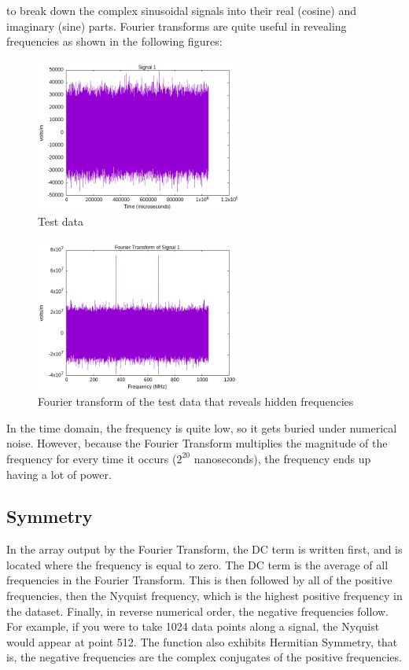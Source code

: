 \documentclass[12pt, reqno]{amsart}
\begin{document}
to break down the complex sinusoidal signals into their real (cosine) and imaginary (sine) parts.
Fourier transforms are quite useful in revealing frequencies as shown in the following figures:
    \begin{figure}[h]
    \centering
    \includegraphics[width=0.6\textwidth]{test_08.png}
    \caption{Test data}
    \label{fig:test-08}
\end{figure}
    \begin{figure}[h]
    \centering
    \includegraphics[width=0.6\textwidth]{fft_test_08.png}
    \caption{Fourier transform of the test data that reveals hidden frequencies}
    \label{fig:fft-test-08}
\end{figure}

In the time domain, the frequency is quite low, so it gets buried under numerical noise. However, because the Fourier Transform multiplies the magnitude of the frequency for every time it occurs ($2^{20}$ nanoseconds), the frequency ends up having a lot of power.

\subsection{Symmetry}
\noindent In the array output by the Fourier Transform, the DC term is written first, and is located where the frequency is equal to zero. The DC term is the average of all frequencies in the Fourier Transform. This is then followed by all of the positive frequencies, then the Nyquist frequency, which is the highest positive frequency in the dataset. Finally, in reverse numerical order, the negative frequencies follow. For example, if you were to take 1024 data points along a signal, the Nyquist would appear at point 512. The function also exhibits Hermitian Symmetry, that is, the negative frequencies are the complex conjugates of the positive frequencies. 
\end{document}
